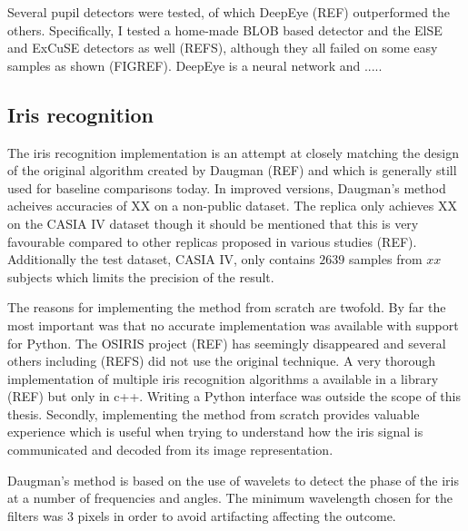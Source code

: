 Several pupil detectors were tested, of which DeepEye (REF) outperformed the others. Specifically, I tested a home-made BLOB based detector and the ElSE and ExCuSE detectors as well (REFS), although they all failed on some easy samples as shown (FIGREF). DeepEye is a neural network and .....

\subsection{Iris recognition}
The iris recognition implementation is an attempt at closely matching the design of the original algorithm created by Daugman (REF) and which is generally still used for baseline comparisons today. In improved versions, Daugman's method acheives accuracies of XX on a non-public dataset. The replica only achieves XX on the CASIA IV dataset though it should be mentioned that this is very favourable compared to other replicas proposed in various studies (REF). Additionally the test dataset, CASIA IV, only contains $2639$ samples from $xx$ subjects which limits the precision of the result.

The reasons for implementing the method from scratch are twofold. By far the most important was that no accurate implementation was available with support for Python. The OSIRIS project (REF) has seemingly disappeared and several others including (REFS) did not use the original technique. A very thorough implementation of multiple iris recognition algorithms a available in a library (REF) but only in c++. Writing a Python interface was outside the scope of this thesis. Secondly, implementing the method from scratch provides valuable experience which is useful when trying to understand how the iris signal is communicated and decoded from its image representation.


Daugman's method is based on the use of wavelets to detect the phase of the iris at a number of frequencies and angles. The minimum wavelength chosen for the filters was 3 pixels in order to avoid artifacting affecting the outcome.

